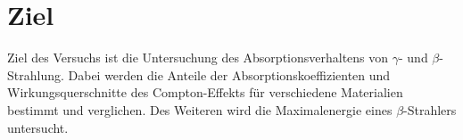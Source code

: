 \section{Ziel}
\label{sec:Ziel}

Ziel des Versuchs ist die Untersuchung des Absorptionsverhaltens
von $\gamma$- und $\beta$-Strahlung.
Dabei werden die Anteile der Absorptionskoeffizienten und Wirkungsquerschnitte 
des Compton-Effekts für verschiedene Materialien bestimmt und verglichen.
Des Weiteren wird die Maximalenergie eines $\beta$-Strahlers untersucht.